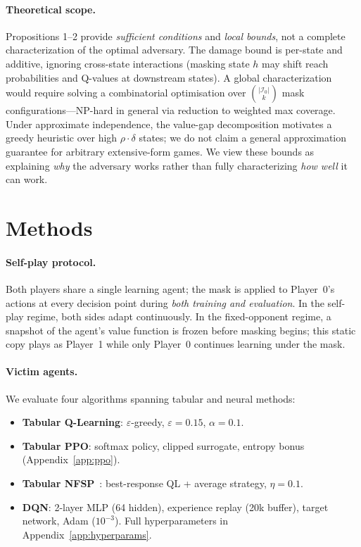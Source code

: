\documentclass{article}
\begin{document}
\paragraph{Theoretical scope.}
Propositions 1--2 provide \emph{sufficient conditions} and \emph{local bounds}, not a complete characterization of the optimal adversary. The damage bound is per-state and additive, ignoring cross-state interactions (masking state $h$ may shift reach probabilities and Q-values at downstream states). A global characterization would require solving a combinatorial optimisation over $\binom{|\mathcal{I}_0|}{k}$ mask configurations---NP-hard in general via reduction to weighted max coverage. Under approximate independence, the value-gap decomposition motivates a greedy heuristic over high $\rho \cdot \delta$ states; we do not claim a general approximation guarantee for arbitrary extensive-form games. We view these bounds as explaining \emph{why} the adversary works rather than fully characterizing \emph{how well} it can work.

\section{Methods}

\paragraph{Self-play protocol.}
Both players share a single learning agent; the mask is applied to Player~0's actions at every decision point during \emph{both training and evaluation}. In the self-play regime, both sides adapt continuously. In the fixed-opponent regime, a snapshot of the agent's value function is frozen before masking begins; this static copy plays as Player~1 while only Player~0 continues learning under the mask.

\paragraph{Victim agents.}
We evaluate four algorithms spanning tabular and neural methods:
\begin{itemize}
\item \textbf{Tabular Q-Learning}: $\varepsilon$-greedy, $\varepsilon = 0.15$, $\alpha = 0.1$.
\item \textbf{Tabular PPO}: softmax policy, clipped surrogate, entropy bonus (Appendix~\ref{app:ppo}).
\item \textbf{Tabular NFSP}~\citep{heinrich2016deep}: best-response QL + average strategy, $\eta = 0.1$.
\item \textbf{DQN}: 2-layer MLP (64 hidden), experience replay (20k buffer), target network, Adam ($10^{-3}$). Full hyperparameters in Appendix~\ref{app:hyperparams}.
\end{itemize}
\end{document}

